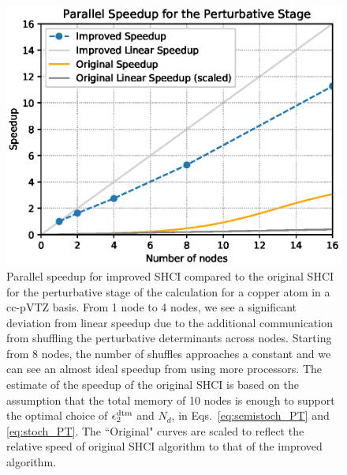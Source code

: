 \documentclass[%
reprint,
 superscriptaddress,
 amsmath,amssymb,
 aps,
]{revtex4-1}
\begin{document}
\begin{figure}[h]
  \includegraphics[width=\linewidth]{scalability/dtm.eps}
  \caption{
Parallel speedup for improved SHCI compared to the original SHCI for the perturbative stage of the
calculation for a copper atom in a cc-pVTZ basis.
From 1 node to 4 nodes, we see a significant deviation from linear speedup due to the additional communication from shuffling the perturbative determinants across nodes.
Starting from 8 nodes, the number of shuffles approaches a constant and we can see an almost ideal speedup from using more processors.
The estimate of the speedup of the original SHCI is based on the assumption that the total memory of 10 nodes is enough to support
the optimal choice of $\epsilon_2^{\rm dtm}$ and $N_d$, in Eqs.~\ref{eq:semistoch_PT} and \ref{eq:stoch_PT}.
The ``Original" curves are scaled to reflect the relative speed of original SHCI algorithm to that of the improved algorithm.
}
  \label{fig:parapt}
\end{figure}

\end{document}

